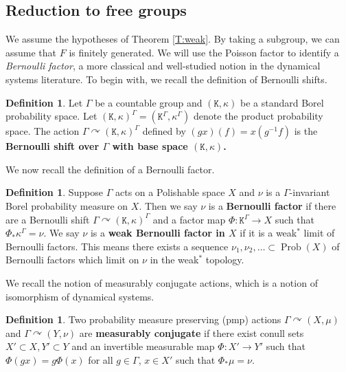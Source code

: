\documentclass[11pt]{amsart}
\theoremstyle{definition}
\newtheorem{definition}[theorem]{Definition}
\theoremstyle{remark}
\newcommand{\G}{\Gamma}
\newcommand{\Prob}{\operatorname{Prob}}
\def\cc{{\curvearrowright}}
\begin{document}
\subsection{Reduction to free groups} \label{sec:reduction-free}

We assume the hypotheses of Theorem \ref{T:weak}.  By taking a subgroup, we can  assume that $F$ is finitely generated. We will use the Poisson factor to identify a \emph{Bernoulli factor}, a more classical and well-studied notion in the dynamical systems literature.  To begin with, we recall the definition of Bernoulli shifts.

\begin{definition}
    Let $\G$ be a countable group and $(\mathtt{K},\kappa)$ be a standard Borel probability space. Let $(\mathtt{K},\kappa)^\G = (\mathtt{K}^\G,\kappa^\G)$ denote the product probability space. The action $\G \cc (\mathtt{K},\kappa)^\G$ defined by $(gx)(f)=x(g^{-1}f)$ is the \textbf{Bernoulli shift over $\G$ with base space $(\mathtt{K},\kappa)$.} 
\end{definition}

We now recall the definition of a Bernoulli factor.

\begin{definition}
Suppose $\G$ acts on a Polishable space $X$ and $\nu$ is a $\G$-invariant Borel probability measure on $X$. Then we say $\nu$ is a \textbf{Bernoulli factor} if there are a Bernoulli shift $\G \cc (\mathtt{K},\kappa)^\G$ and a factor map $\Phi:\mathtt{K}^\G \to X$ such that $\Phi_*\kappa^\G = \nu$. We say $\nu$ is a \textbf{weak Bernoulli factor in $X$} if it is a weak$^*$ limit of Bernoulli factors. This means there exists a sequence $\nu_1,\nu_2,\ldots \subset \Prob(X)$ of Bernoulli factors which limit on $\nu$ in the weak$^*$ topology.

\end{definition}

We recall the notion of measurably conjugate actions, which is a notion of isomorphism of dynamical systems. 

\begin{definition}
    Two probability measure preserving (pmp) actions $\G \cc (X,\mu)$ and $\G \cc (Y,\nu)$ are \textbf{measurably conjugate} if there exist conull sets $X' \subset X, Y' \subset Y$ and an invertible measurable map $\Phi:X' \to Y'$ such that $\Phi(gx)=g\Phi(x)$ for all $g\in \G$, $x\in X'$ such that $\Phi_*\mu=\nu$.
\end{definition}
\end{document}

